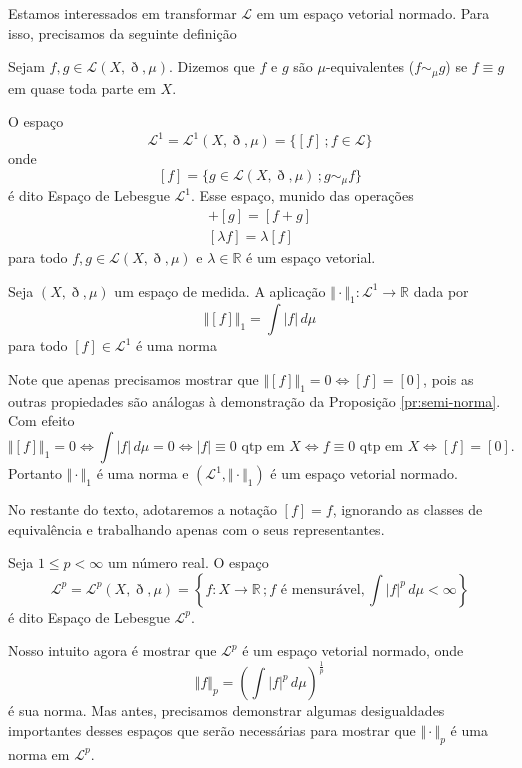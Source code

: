 \documentclass[a4paper, 11pt]{book}
\theoremstyle{definition}
\newcommand{\bR}{\mathbb{R}}
\newcommand{\cL}{\mathcal{L}}
\begin{document}
Estamos interessados em transformar $\cL$ em um espaço vetorial normado.
Para isso, precisamos da seguinte definição
\begin{dbox}
    Sejam $f,g \in \cL(X,\eth,\mu)$. Dizemos que $f$ e $g$ são $\mu$-equivalentes ($f \sim_\mu g$) se $f \equiv g$ em quase toda parte em $X$.
\end{dbox}
O espaço
\[
    \cL^1 = \cL^1(X,\eth,\mu) =\{[f] \,; f \in \cL\}
\]
onde
\[
    [f] = \{g \in \cL(X,\eth,\mu) \,; g \sim_\mu f\}
\]
é dito Espaço de Lebesgue $\cL^1$.
Esse espaço, munido das operações
\begin{gather*}
    [f] + [g] = [f + g]\\
    [\lambda f] = \lambda [f]
\end{gather*}
para todo $f, g \in \cL(X,\eth,\mu)$ e $\lambda \in \bR$ é um espaço vetorial.

\begin{pbox}
    Seja $(X,\eth,\mu)$ um espaço de medida.
    A aplicação $\Vert \cdot \Vert_1 : \cL^1 \to \bR$ dada por
    \[
        \Vert [f] \Vert_1 = \int |f| \,d\mu
    \]
    para todo $[f] \in \cL^1$ é uma norma
\end{pbox}
\begin{prf}
    Note que apenas precisamos mostrar que $\Vert [f] \Vert_1 = 0 \iff [f] = [0]$, pois as outras propiedades são análogas à demonstração da Proposição \ref{pr:semi-norma}.
    Com efeito
    \[
        \Vert [f] \Vert_1 = 0 \iff \int |f| \,d\mu = 0 \iff |f| \equiv 0 \text{ qtp em } X \iff f \equiv 0 \text{ qtp em } X \iff [f] = [0].
    \]
    Portanto $\Vert \cdot \Vert_1$ é uma norma e $(\cL^1,\Vert \cdot \Vert_1)$ é um espaço vetorial normado.
\end{prf}

No restante do texto, adotaremos a notação $[f] = f$, ignorando as classes de equivalência e trabalhando apenas com o seus representantes.

\begin{dbox}
    Seja $1 \leqslant p < \infty$ um número real.
    O espaço
    \[
        \cL^p = \cL^p(X,\eth,\mu) = \left\{ f : X \to \bR \,; f \text{ é mensurável}, \int|f|^p \, d\mu < \infty \right\}
    \]
    é dito Espaço de Lebesgue $\cL^p$.
\end{dbox}
Nosso intuito agora é mostrar que $\cL^p$ é um espaço vetorial normado, onde
\[
    \Vert f \Vert_p = \left( \int |f|^p \,d\mu \right)^{\frac{1}{p}}
\]
é sua norma.
Mas antes, precisamos demonstrar algumas desigualdades importantes desses espaços que serão necessárias para mostrar que $\Vert \cdot \Vert_p$ é uma norma em $\cL^p$.
\end{document}
